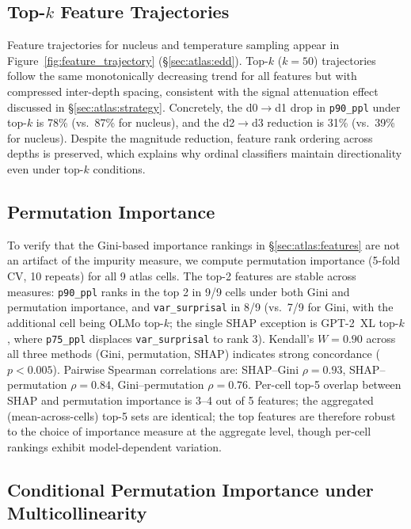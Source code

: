 \subsection{Top-$k$ Feature Trajectories}
\label{app:topk_trajectories}

Feature trajectories for nucleus and temperature sampling appear in Figure~\ref{fig:feature_trajectory} (\S\ref{sec:atlas:edd}).
Top-$k$ ($k{=}50$) trajectories follow the same monotonically decreasing trend for all features but with compressed inter-depth spacing, consistent with the signal attenuation effect discussed in \S\ref{sec:atlas:strategy}.
Concretely, the d0$\to$d1 drop in \texttt{p90\_ppl} under top-$k$ is 78\% (vs.\ 87\% for nucleus), and the d2$\to$d3 reduction is 31\% (vs.\ 39\% for nucleus).
Despite the magnitude reduction, feature rank ordering across depths is preserved, which explains why ordinal classifiers maintain directionality even under top-$k$ conditions.

\subsection{Permutation Importance}
\label{app:permutation}

To verify that the Gini-based importance rankings in \S\ref{sec:atlas:features} are not an artifact of the impurity measure, we compute permutation importance (5-fold CV, 10 repeats) for all 9 atlas cells.
The top-2 features are stable across measures: \texttt{p90\_ppl} ranks in the top 2 in 9/9 cells under both Gini and permutation importance, and \texttt{var\_surprisal} in 8/9 (vs.\ 7/9 for Gini, with the additional cell being OLMo top-$k$; the single SHAP exception is GPT-2~XL top-$k$, where \texttt{p75\_ppl} displaces \texttt{var\_surprisal} to rank 3).
Kendall's $W{=}0.90$ across all three methods (Gini, permutation, SHAP) indicates strong concordance ($p{<}0.005$).
Pairwise Spearman correlations are: SHAP--Gini $\rho{=}0.93$, SHAP--permutation $\rho{=}0.84$, Gini--permutation $\rho{=}0.76$.
Per-cell top-5 overlap between SHAP and permutation importance is 3--4 out of 5 features; the aggregated (mean-across-cells) top-5 sets are identical; the top features are therefore robust to the choice of importance measure at the aggregate level, though per-cell rankings exhibit model-dependent variation.

\subsection{Conditional Permutation Importance under Multicollinearity}
\label{app:conditional_pi}

